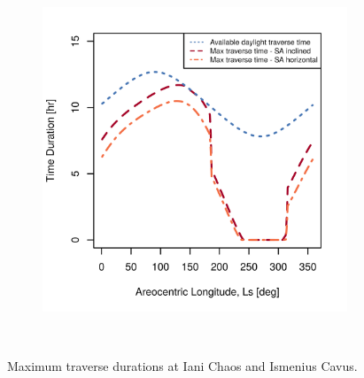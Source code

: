 \begin{figure}[h]
\begin{subfigure}[t]{\subfigureWidth}
        \includegraphics[height=\graphicsHeight]{sections/design/solar-array/plots/ismeniuscavus-75w-max-traverse-durations-for-sa-area-28m2.png}
		\label{fig:plot:sub:final-maximum-traverse-durations-ismenius-cavus}
	\end{subfigure}\\[0.8ex]
    \caption[Maximum traverse durations at Iani Chaos and Ismenius Cavus]
            {Maximum traverse durations at Iani Chaos and Ismenius Cavus.}
    \label{fig:plot:final-maximum-traverse-durations-at-missions-sites}
\vspace{-2ex}
\end{figure}



\clearpage
